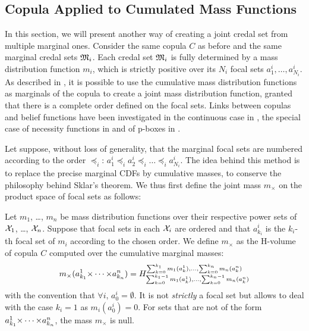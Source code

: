 \subsection{Copula Applied to Cumulated Mass Functions}\label{sec:joint_mass}
In this section, we will present another way of creating a joint credal set from multiple marginal ones. Consider the same copula $C$ as before and the same marginal credal sets ${\mathfrak{M}}_i$. Each credal set ${\mathfrak{M}}_i$ is fully determined by a mass distribution function $m_i$, which is strictly positive over its $N_i$ focal sets $a^i_1, \dots, a^i_{N_i}$. As described in \cite{ferson_dependence_2004}, it is possible to use the cumulative mass distribution functions as marginals of the copula to create a joint mass distribution function, granted that there is a complete order defined on the focal sets. Links between copulas and belief functions have been investigated in the continuous case in \cite{schmelzer_joint_2015, schmelzer_multivariate_2019}, the special case of necessity functions in \cite{schmelzer_sklars_2015} and of p-boxes in \cite{schmelzer_random_2023}.

Let suppose, without loss of generality, that the marginal focal sets are numbered according to the order $\preceq_i$: $a^i_1\preceq_ia^i_2\preceq_i\dots\preceq_i a^i_{N_i}$. The idea behind this method is to replace the precise marginal CDFs by cumulative masses, to conserve the philosophy behind Sklar's theorem. We thus first define the joint mass $m_\times$ on the product space of focal sets as follows:

\begin{definition}\label{def:joint_mass}
    Let $m_1$, \dots, $m_n$ be mass distribution functions over their respective power sets of ${\mathcal{X}}_1$, \dots, ${\mathcal{X}}_n$. Suppose that focal sets in each ${\mathcal{X}}_i$ are ordered and that $a_{k_i}^i$ is the $k_i$-th focal set of $m_i$ according to the chosen order. We define $m_\times$ as the H-volume of copula $C$ computed over the cumulative marginal masses:
    \begin{eqnarray}\label{eq:joint_mass}
        m_\times(a^1_{k_1}{\times\dots\times} a^n_{k_n}) = H_{\sum_{k=0}^{k_1-1}m_1(a^1_k), \dots, \sum_{k=0}^{k_n-1}m_n(a^n_k)}^{\sum_{k=0}^{k_1}m_1(a^1_k), \dots, \sum_{k=0}^{k_n}m_n(a^n_k)}
    \end{eqnarray}
    with the convention that $\forall i,\, a^i_0=\emptyset$. It is not \textit{strictly} a focal set but allows to deal with the case $k_i=1$ as $m_i(a^i_0)=0$. For sets that are not of the form $a^1_{k_1}{\times\dots\times} a^n_{k_n}$, the mass $m_\times$ is null.
\end{definition}


